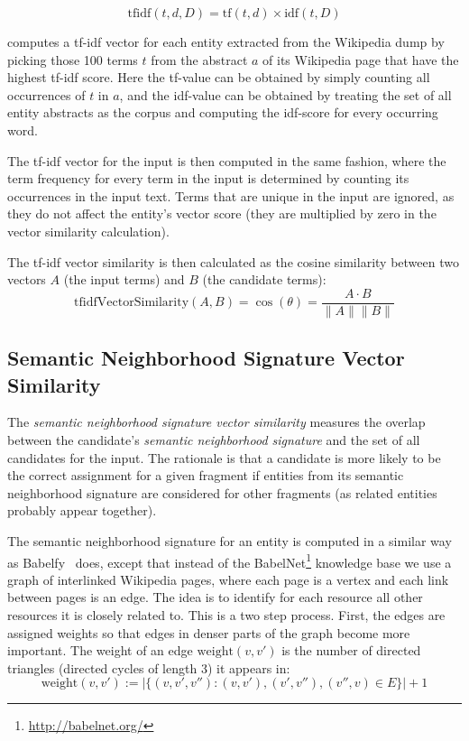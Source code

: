 \documentclass[runningheads,a4paper]{llncs}
\begin{document}
{$$ \mathrm{tfidf}(t, d, D) = \mathrm{tf}(t, d) \times \mathrm{idf}(t, D) $$

{\acronym} computes a tf-idf vector for each entity extracted from the Wikipedia dump by picking those 100 terms $t$ from the abstract $a$ of its Wikipedia page that have the highest tf-idf score. Here the tf-value can be obtained by simply counting all occurrences of $t$ in $a$, and the idf-value can be obtained by treating the set of all entity abstracts as the corpus and computing the idf-score for every occurring word. 

The tf-idf vector for the input is then computed in the same fashion, where the term frequency for every term in the input is determined by counting its occurrences in the input text. Terms that are unique in the input are ignored, as they do not affect the entity's vector score (they are multiplied by zero in the vector similarity calculation).

The tf-idf vector similarity is then calculated as the cosine similarity between two vectors $A$ (the input terms) and $B$ (the candidate terms):
$$\mathrm{tfidfVectorSimilarity}(A, B) = \cos(\theta) = \frac{A \cdot B}{\|A\| \|B\|}$$

\subsection{Semantic Neighborhood Signature Vector Similarity}

The \emph{semantic neighborhood signature vector similarity} measures the overlap between the candidate's \emph{semantic neighborhood signature} and the set of all candidates for the input. The rationale is that a candidate is more likely to be the correct assignment for a given fragment if entities from its semantic neighborhood signature are considered for other fragments (as related entities probably appear together).

The semantic neighborhood signature for an entity is computed in a similar way as Babelfy~\cite{babelfy} does, except that instead of the BabelNet\footnote{\url{http://babelnet.org/}} knowledge base we use a graph of interlinked Wikipedia pages, where each page is a vertex and each link between pages is an edge. The idea is to identify for each resource all other resources it is closely related to. This is a two step process. First, the edges are assigned weights so that edges in denser parts of the graph become more important. The weight of an edge $\mathrm{weight}(v, v')$ is the number of directed triangles (directed cycles of length 3) it appears in:
$$\mathrm{weight}(v, v') := |\{(v, v', v'') : (v, v'), (v', v''), (v'', v) \in E\}| + 1$$

}
\end{document}
